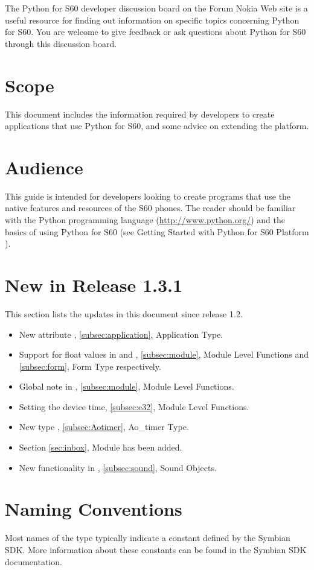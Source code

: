 The Python for S60 developer discussion board \cite{PyS60DiBo} on the 
Forum Nokia Web site is a useful resource for finding out information on 
specific topics concerning Python for S60. You are welcome to give 
feedback or ask questions about Python for S60 through this discussion 
board.

\section{Scope}
\label{subsec:scope}

This document includes the information required by developers to create 
applications that use Python for S60, and some advice on extending the 
platform.

\section{Audience}
\label{subsec:audience}

This guide is intended for developers looking to create programs that use the 
native features and resources of the S60 phones. The reader should be 
familiar with the Python programming language (\url{http://www.python.org/}) and 
the basics of using Python for S60 (see Getting Started with Python for 
S60 Platform \cite{PyS60Start}).

\section{New in Release 1.3.1}
\label{subsec:new}

This section lists the updates in this document since release 1.2.

\begin{itemize}
\item New attribute , \ref{subsec:application}, Application Type.
\item Support for float values in  and , \ref{subsec:module}, Module Level Functions and \ref{subsec:form}, Form Type respectively.
\item Global note in , \ref{subsec:module}, Module Level Functions.
\item Setting the device time, \ref{subsec:e32}, Module Level Functions.
\item New type , \ref{subsec:Aotimer}, Ao\_timer Type.
\item Section \ref{sec:inbox},  Module has been added.
\item New functionality in , \ref{subsec:sound}, Sound Objects.
\end{itemize}

\section{Naming Conventions}
\label{subsec:naming}

Most names of the type  typically indicate a constant defined 
by the Symbian SDK. More information about these constants can be found in the 
Symbian SDK documentation.
